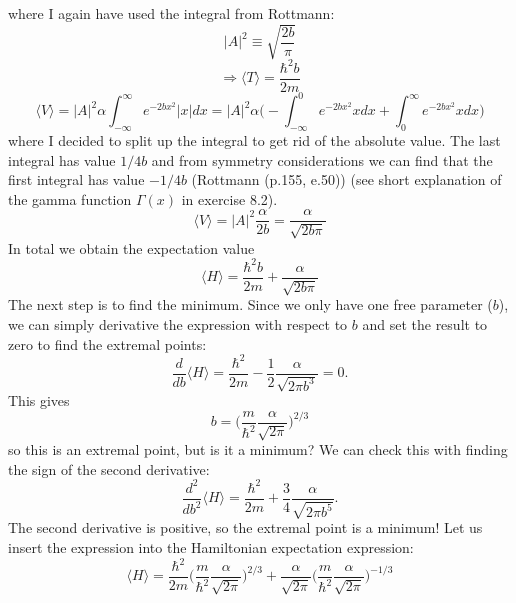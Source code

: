 \documentclass{scrartcl}
\begin{document}
where I again have used the integral from Rottmann:
\begin{equation}
|A|^2\equiv\sqrt{\frac{2b}{\pi}}
\end{equation}
\begin{equation}
\Rightarrow \langle T\rangle = \frac{\hbar^2b}{2m}
\label{eq:Kinetic}
\end{equation}
\begin{equation*}
\langle V\rangle = |A|^2\alpha\int_{-\infty}^{\infty}e^{-2bx^2}|x|dx=|A|^2\alpha\bigg(-\int_{-\infty}^{0}e^{-2bx^2}xdx+\int_0^{\infty}e^{-2bx^2}xdx\bigg)
\end{equation*}
where I decided to split up the integral to get rid of the absolute value. The last integral has value $1/4b$ and from symmetry considerations we can find that the first integral has value $-1/4b$ (Rottmann (p.155, e.50)) (see short explanation of the gamma function $\Gamma(x)$ in exercise 8.2). 
\begin{equation}
\langle V\rangle = |A|^2\frac{\alpha}{2b}=\frac{\alpha}{\sqrt{2b\pi}}
\end{equation}
In total we obtain the expectation value
\begin{equation}
\langle H\rangle = \frac{\hbar^2b}{2m} + \frac{\alpha}{\sqrt{2b\pi}}
\end{equation}
The next step is to find the minimum. Since we only have one free parameter ($b$), we can simply derivative the expression with respect to $b$ and set the result to zero to find the extremal points:
\begin{equation*}
\frac{d}{db}\langle H\rangle = \frac{\hbar^2}{2m}-\frac{1}{2}\frac{\alpha}{\sqrt{2\pi b^3}}=0.
\end{equation*}
This gives
\begin{equation}
b=\bigg(\frac{m}{\hbar^2}\frac{\alpha}{\sqrt{2\pi}}\bigg)^{2/3}
\end{equation}
so this is an extremal point, but is it a minimum? We can check this with finding the sign of the second derivative:
\begin{equation*}
\frac{d^2}{db^2}\langle H\rangle = \frac{\hbar^2}{2m}+\frac{3}{4}\frac{\alpha}{\sqrt{2\pi b^5}}.
\end{equation*}
The second derivative is positive, so the extremal point is a minimum! Let us insert the expression into the Hamiltonian expectation expression:
\begin{equation}
\langle H\rangle = \frac{\hbar^2}{2m}\bigg(\frac{m}{\hbar^2}\frac{\alpha}{\sqrt{2\pi}}\bigg)^{2/3}+\frac{\alpha}{\sqrt{2\pi}}\bigg(\frac{m}{\hbar^2}\frac{\alpha}{\sqrt{2\pi}}\bigg)^{-1/3}
\end{equation}
\end{document}
